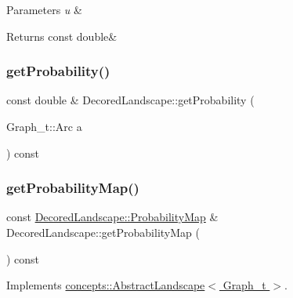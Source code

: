 \begin{DoxyParams}{Parameters}
{\em u} & \\
\hline
\end{DoxyParams}
\begin{DoxyReturn}{Returns}
const double\& 
\end{DoxyReturn}
\mbox{\label{class_decored_landscape_a09b5ea325960556e0a834a53a7b53000}} 
\subsubsection{\texorpdfstring{get\+Probability()}{getProbability()}}
{\footnotesize\ttfamily const double \& Decored\+Landscape\+::get\+Probability (\begin{DoxyParamCaption}\item[{Graph\+\_\+t\+::\+Arc}]{a }\end{DoxyParamCaption}) const}

\mbox{\label{class_decored_landscape_afdc878affae92d7c671f1e0f87223ee0}} 
\subsubsection{\texorpdfstring{get\+Probability\+Map()}{getProbabilityMap()}}
{\footnotesize\ttfamily const \hyperlink{classconcepts_1_1_abstract_landscape_ae90ffb759facff21b29e646539352182}{Decored\+Landscape\+::\+Probability\+Map} \& Decored\+Landscape\+::get\+Probability\+Map (\begin{DoxyParamCaption}{ }\end{DoxyParamCaption}) const\hspace{0.3cm}{\ttfamily [virtual]}}



Implements \hyperlink{classconcepts_1_1_abstract_landscape_a4ecbe83965a5266a3a2fa14e201c5871}{concepts\+::\+Abstract\+Landscape$<$ Graph\+\_\+t $>$}.

\mbox{\label{class_decored_landscape_a16bd4da5d77b804cecb864c11770a344}} 
